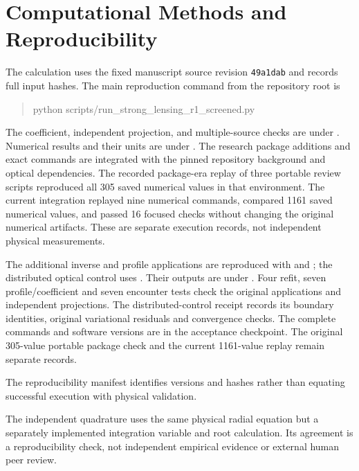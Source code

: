 


\section{Computational Methods and Reproducibility}
The calculation uses the fixed manuscript source revision
\texttt{49a1dab} and records full input hashes.
The main reproduction command from the repository root is
\begin{quote}\small\ttfamily
python scripts/run\_strong\_lensing\_r1\_screened.py
\end{quote}
The coefficient, independent projection, and multiple-source checks are
under . Numerical results and their
units are under
.
The research package additions and exact commands are integrated with the
pinned repository background and optical dependencies. The recorded
package-era replay of three portable review scripts reproduced all 305
saved numerical values in that environment. The current integration
replayed nine numerical commands, compared 1161 saved numerical values,
and passed 16 focused checks without changing the original numerical
artifacts. These are separate execution records, not independent
physical measurements.

The additional inverse and profile applications are reproduced with
 and
; the distributed optical
control uses .
Their outputs are under
.
Four refit, seven profile/coefficient and seven encounter tests check
the original applications and independent projections. The distributed-control
receipt records its boundary identities, original variational residuals
and convergence checks. The complete commands and software versions
are in the acceptance checkpoint. The original 305-value portable
package check and the current 1161-value replay remain separate records.

The reproducibility manifest identifies versions and hashes rather than
equating successful execution with physical validation.

The independent quadrature uses the same physical radial equation but a separately
implemented integration variable and root calculation. Its agreement is a
reproducibility check, not independent empirical evidence or external
human peer review.

